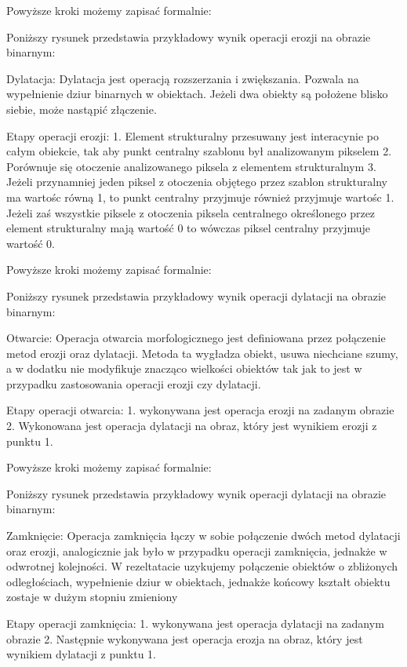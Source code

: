 \documentclass[a4paper,12pt,twoside,openany]{report}
\begin{document}
Powyższe kroki możemy zapisać formalnie:

Poniższy rysunek przedstawia przykładowy wynik operacji erozji na obrazie binarnym:

Dylatacja:
Dylatacja jest operacją rozszerzania i zwiększania. Pozwala na wypełnienie dziur binarnych w obiektach. Jeżeli dwa obiekty są położene blisko siebie, może nastąpić złączenie.  

Etapy operacji erozji:
1. Element strukturalny przesuwany jest interacynie po całym obiekcie,  tak aby punkt centralny szablonu był analizowanym pikselem
2. Porównuje się otoczenie analizowanego piksela z elementem strukturalnym
3. Jeżeli przynamniej jeden piksel z otoczenia objętego przez szablon strukturalny ma wartośc równą 1, to punkt centralny przyjmuje również przyjmuje wartośc 1. Jeżeli zaś wszystkie piksele z otoczenia piksela centralnego określonego przez element strukturalny mają wartość 0 to wówczas piksel centralny przyjmuje wartość 0.

Powyższe kroki możemy zapisać formalnie:

Poniższy rysunek przedstawia przykładowy wynik operacji dylatacji na obrazie binarnym:


Otwarcie:
Operacja otwarcia morfologicznego jest definiowana przez połączenie metod erozji oraz dylatacji. Metoda ta wygładza obiekt, usuwa niechciane szumy, a w dodatku nie modyfikuje znacząco wielkości obiektów tak jak to jest w przypadku zastosowania operacji erozji czy dylatacji.

Etapy operacji otwarcia:
1. wykonywana jest operacja erozji na zadanym obrazie
2. Wykonowana jest operacja dylatacji na obraz, który jest wynikiem erozji z punktu 1.

Powyższe kroki możemy zapisać formalnie:

Poniższy rysunek przedstawia przykładowy wynik operacji dylatacji na obrazie binarnym:

Zamknięcie:
Operacja zamknięcia łączy w sobie połączenie dwóch metod dylatacji oraz erozji, analogicznie jak było w przypadku operacji zamknięcia, jednakże w odwrotnej kolejności. W rezeltatacie uzykujemy połączenie obiektów o zbliżonych odległościach, wypełnienie dziur w obiektach, jednakże końcowy kształt obiektu zostaje w dużym stopniu zmieniony 

Etapy operacji zamknięcia:
1. wykonywana jest operacja dylatacji na zadanym obrazie
2. Następnie wykonywana jest operacja erozja na obraz, który jest wynikiem dylatacji z punktu 1.
\end{document}
